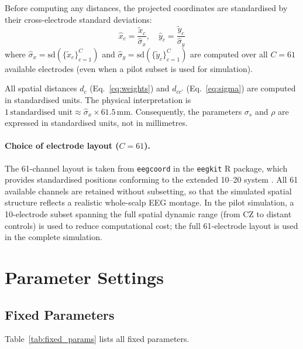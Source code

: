 \documentclass[12pt, a4paper]{article}
\begin{document}
Before computing any distances, the projected coordinates are
standardised by their cross-electrode standard deviations:
%
\begin{equation}\label{eq:standardise}
  \hat{x}_c = \frac{\tilde{x}_c}{\hat{\sigma}_x}, \quad
  \hat{y}_c = \frac{\tilde{y}_c}{\hat{\sigma}_y}
\end{equation}
%
where $\hat{\sigma}_x = \mathrm{sd}(\{\tilde{x}_c\}_{c=1}^C)$ and
$\hat{\sigma}_y = \mathrm{sd}(\{\tilde{y}_c\}_{c=1}^C)$ are computed over
all $C = 61$ available electrodes (even when a pilot subset is used for
simulation).

All spatial distances $d_c$ (Eq.~\ref{eq:weights}) and $d_{cc'}$
(Eq.~\ref{eq:sigma}) are computed in standardised units.
The physical interpretation is
$1\,\text{standardised unit} \approx \hat{\sigma}_x \times 61.5\,\text{mm}$.
Consequently, the parameters $\sigma_s$ and $\rho$ are expressed in
standardised units, not in millimetres.

\paragraph{Choice of electrode layout ($C = 61$).}
The 61-channel layout is taken from \texttt{eegcoord} in the \texttt{eegkit}
R package, which provides standardised positions conforming to the extended
10--20 system \citep{NunezSrinivasan2006}.
All 61 available channels are retained without subsetting, so that the
simulated spatial structure reflects a realistic whole-scalp EEG montage.
In the pilot simulation, a 10-electrode subset spanning the full spatial
dynamic range (from CZ to distant controls) is used to reduce computational
cost; the full 61-electrode layout is used in the complete simulation.

\section{Parameter Settings}\label{sec:params}

\subsection{Fixed Parameters}

Table~\ref{tab:fixed_params} lists all fixed parameters.
\end{document}
